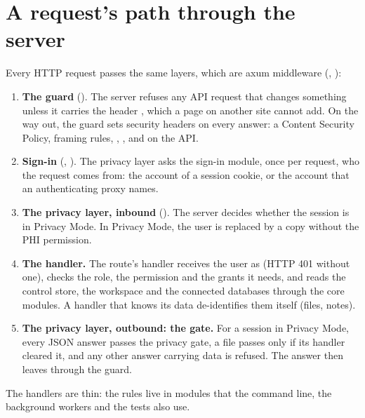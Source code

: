 \section{A request's path through the server}
\label{sec:architecture-request}


Every HTTP request passes the same layers, which are axum middleware (,
):
\begin{enumerate}
\item \textbf{The guard} (). The server refuses any API request that changes
  something unless it carries the header , which a page on another site
  cannot add. On the way out, the guard sets security headers on every answer: a Content
  Security Policy, framing rules, , , and  on the
  API.
\item \textbf{Sign-in} (, ). The privacy layer asks the sign-in
  module, once per request, who the request comes from: the account of a session cookie, or the
  account that an authenticating proxy names.
\item \textbf{The privacy layer, inbound} (). The server decides whether the
  session is in Privacy Mode. In Privacy Mode, the user is replaced by a copy without the PHI
  permission.
\item \textbf{The handler.} The route's handler receives the user as  (HTTP 401
  without one), checks the role, the permission and the grants it needs, and reads the control
  store, the workspace and the connected databases through the core modules. A handler that knows
  its data de-identifies them itself (files, notes).
\item \textbf{The privacy layer, outbound: the gate.} For a session in Privacy Mode, every JSON
  answer passes the privacy gate, a file passes only if its handler cleared it, and any other
  answer carrying data is refused. The answer then leaves through the guard.
\end{enumerate}
The handlers are thin: the rules live in modules that the command line, the background workers
and the tests also use.

